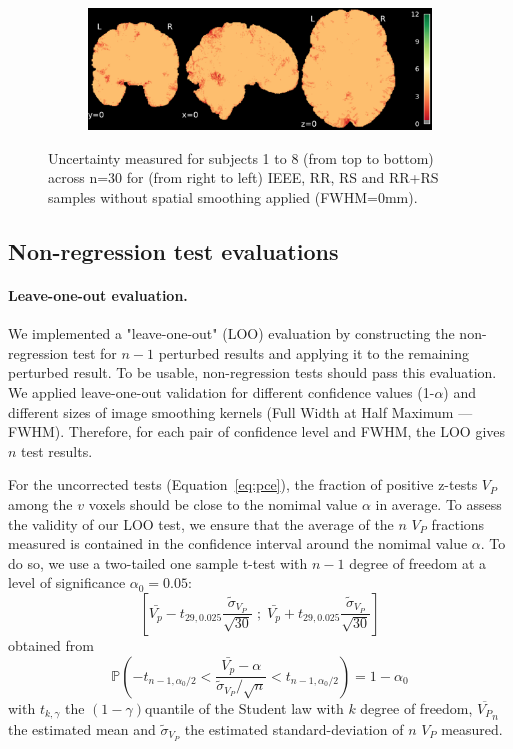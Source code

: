 \documentclass{article}
\begin{document}
\begin{landscape}
\begin{figure}
\begin{subfigure}[t]{0.2\paperheight}
        \end{subfigure}
        \begin{subfigure}[t]{0.2\paperheight}
            \centering
            \includegraphics[width=\textwidth]{figures/sig/ds002338_sub-xp207_rr.rs_sig.pdf}
        \end{subfigure}
        \caption{Uncertainty measured for subjects 1 to 8 (from top to bottom) across n=30 for
            (from right to left) IEEE, RR, RS and RR+RS samples without spatial smoothing applied (FWHM=0mm). }
        \label{fig:uncertainty_sub_1}

    \end{figure}
\end{landscape}

 
\subsection{Non-regression test evaluations}

\paragraph{Leave-one-out evaluation.} We implemented a "leave-one-out" (LOO)
evaluation by constructing the non-regression test for $n-1$ perturbed results
and applying it to the remaining perturbed result. To be usable, non-regression
tests should pass this evaluation. We applied leave-one-out validation for
different  confidence values (1-$\alpha$) and different sizes of image smoothing
kernels (Full Width at Half Maximum --- FWHM). Therefore, for each pair of
confidence level and FWHM, the LOO gives $n$ test results.

For the uncorrected tests (Equation~\ref{eq:pce}), the fraction of positive
z-tests $V_P$ among the $v$ voxels should be close to the nomimal value $\alpha$
in average. To assess the validity of our LOO test, we ensure that the average
of the $n$ $V_P$ fractions measured is contained in the confidence interval
around the nomimal value $\alpha$. To do so, we use a two-tailed one sample
t-test with $n-1$ degree of freedom at a level of significance $\alpha_0=0.05$:
\[
    \left[
    \bar{V_p} -t_{29,0.025} \frac{\tilde{\sigma}_{V_P}}{\sqrt{30}}
    \; ; \;
    \bar{V_p}  + t_{29,0.025} \frac{\tilde{\sigma}_{V_P}}{\sqrt{30}}
    \right]
\]
obtained from
\[
    \mathbb{P}
    \left(
    -t_{n-1,\alpha_0/2}
    <
    \dfrac{\bar{V_p} - \alpha}{\tilde{\sigma}_{V_P} / \sqrt{n}}
    <
    t_{n-1,\alpha_0/2}
    \right)
    = 1 - \alpha_0
\]
with
$t_{k,\gamma}$ the $(1-\gamma)$quantile of the Student law with $k$ degree of freedom,
$\overline{V_P}_n$ the estimated mean and $\tilde{\sigma}_{V_P}$ the estimated standard-deviation
of $n$ $V_P$ measured.
\end{document}

